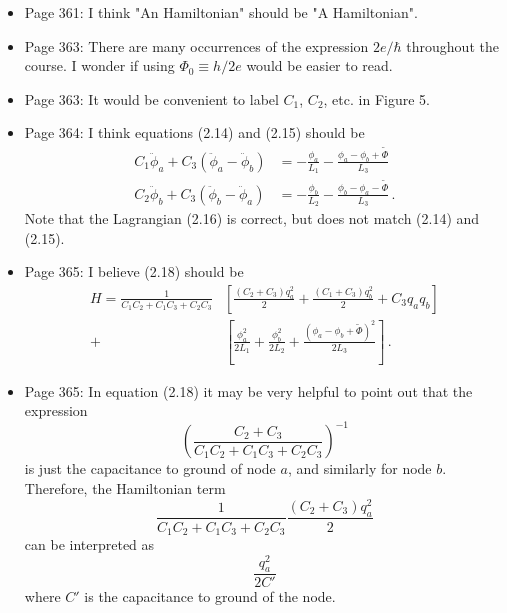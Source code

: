 \documentclass{article}
\begin{document}
\begin{itemize}

\item Page 361: I think "An Hamiltonian" should be "A Hamiltonian".

\item Page 363: There are many occurrences of the expression $2e / \hbar$ throughout the course. I wonder if using $\Phi_0 \equiv h / 2e$ would be easier to read.

\item Page 363: It would be convenient to label $C_1$, $C_2$, etc. in Figure 5.

\item Page 364: I think equations (2.14) and (2.15) should be
\begin{align}
C_1 \ddot{\phi}_a + C_3 ( \ddot{\phi}_a - \ddot{\phi}_b) &= - \frac{\phi_a}{L_1} - \frac{\phi_a - \phi_b + \tilde{\Phi}}{L_3} \nonumber \\
C_2 \ddot{\phi}_b + C_3 ( \ddot{\phi}_b - \ddot{\phi}_a) &= - \frac{\phi_b}{L_2} - \frac{\phi_b - \phi_a - \tilde{\Phi}}{L_3} \nonumber \, .
\end{align}
Note that the Lagrangian (2.16) is correct, but does not match (2.14) and (2.15).

\item Page 365: I believe (2.18) should be
\begin{align}
H = \frac{1}{C_1 C_2 + C_1 C_3 + C_2 C_3} & \left[
\frac{(C_2 + C_3) q_a^2}{2}
+ \frac{(C_1 + C_3)q_b^2}{2}
+ C_3 q_a q_b \right] \nonumber \\
+ & \left[
\frac{\phi_a^2}{2 L_1} + \frac{\phi_b^2}{2 L_2} + \frac{(\phi_a - \phi_b + \tilde{\Phi})^2}{2 L_3} \right] \nonumber \, .
\end{align}

\item Page 365: In equation (2.18) it may be very helpful to point out that the expression
\begin{equation}
\left( \frac{C_2 + C_3}{C_1 C_2 + C_1 C_3 + C_2 C_3} \right)^{-1}
\end{equation}
is just the capacitance to ground of node $a$, and similarly for node $b$.
Therefore, the Hamiltonian term
\begin{equation}
\frac{1}{C_1 C_2 + C_1 C_3 + C_2 C_3} \frac{(C_2 + C_3)q_a^2}{2}
\end{equation}
can be interpreted as
\begin{equation}
\frac{q_a^2}{2 C'}
\end{equation}
where $C'$ is the capacitance to ground of the node.

\end{itemize}
\end{document}
